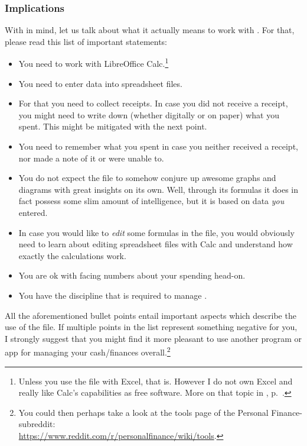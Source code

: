 \subsubsection{Implications}
\label{subsubsec:implications}

With  in mind, let us talk about what it actually means to work with \tfn.
For that, please read this list of important statements:
\begin{itemize}
	\item You need to work with LibreOffice Calc.\footnote{Unless you use the file with Excel, that is.
	However I do not own Excel and really like Calc's capabilities as free software.
	More on that topic in , p.~\pageref{subsec:excel}.}
	\item You need to enter data into spreadsheet files.
	\item For that you need to collect receipts.
	In case you did not receive a receipt, you might need to write down (whether digitally or on paper) what you spent.
	This might be mitigated with the next point.
	\item You need to remember what you spent in case you neither received a receipt, nor made a note of it or were unable to.
	\item You do not expect the file to somehow conjure up awesome graphs and diagrams with great insights on its own.
	Well, through its formulas it does in fact possess some slim amount of intelligence, but it is based on data \emph{you} entered.
	\item In case you would like to \emph{edit} some formulas in the file, you would obviously need to learn about editing spreadsheet files with Calc and understand how exactly the calculations work.
	\item You are ok with facing numbers about your spending head-on.
	\item You have the discipline that is required to manage \tfn.
\end{itemize}
All the aforementioned bullet points entail important aspects which describe the use of the file.
If multiple points in the list represent something negative for you, I strongly suggest that you might find it more pleasant to use another program or app for managing your cash/finances overall.\footnote{You could then perhaps take a look at the tools page of the Personal Finance-subreddit:\\
\href{https://www.reddit.com/r/personalfinance/wiki/tools}{https://www.reddit.com/r/personalfinance/wiki/tools}.}

